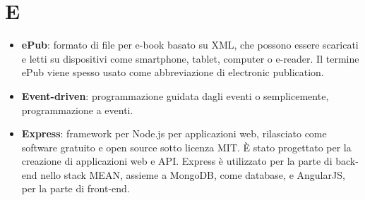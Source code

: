\newpage
\section{E}

\begin{itemize}
	\item \textbf{ePub}: formato di file per e-book basato su XML, che possono essere scaricati e letti su dispositivi come smartphone, tablet, computer o e-reader. Il termine ePub viene spesso usato come abbreviazione di electronic publication.
	\item \textbf{Event-driven}: programmazione guidata dagli eventi o semplicemente, programmazione a eventi.
	\item \textbf{Express}: framework per Node.js per applicazioni web, rilasciato come software gratuito e open source sotto licenza MIT. È stato progettato per la creazione di applicazioni web e API. Express è utilizzato per la parte di back-end nello stack MEAN, assieme a MongoDB, come database, e AngularJS, per la parte di front-end.
\end{itemize}
	